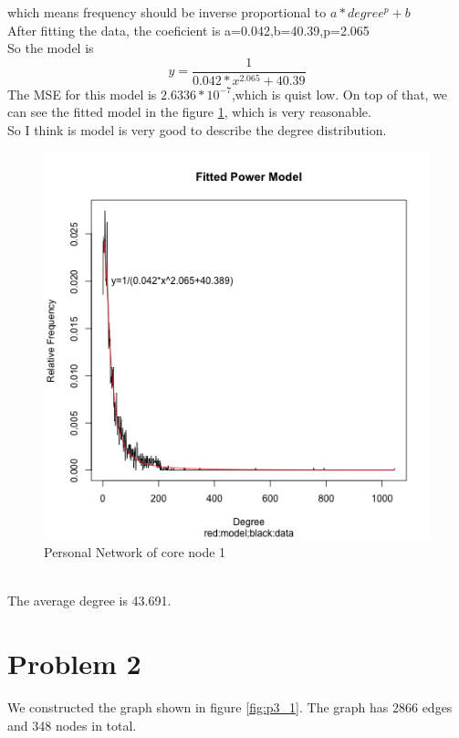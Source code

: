 \documentclass{article}
\begin{document}
which means frequency should be inverse proportional  to $a*degree^{p}+b$\\
After fitting the data, the coeficient is a=0.042,b=40.39,p=2.065\\
So the model is $$y=\frac{1}{0.042*x^{2.065}+40.39}$$
The MSE for this model is $2.6336*10^{-7}$,which is quist low. On top of that, we can see the fitted model in the figure \ref{fig:p1_2}, which is very reasonable.\\
So I think is model is very good to describe the degree distribution.\\
\begin{figure}[htbp]
\centering
\includegraphics[width=.8\textwidth]{1_2.png}
\caption{Personal Network of core node 1}
\label{fig:p1_2}
\end{figure}\\
The average degree is 43.691.
\section{Problem 2}
We constructed the graph shown in figure \ref{fig:p3_1}. The graph has 2866 edges and 348 nodes in total.
\end{document}
